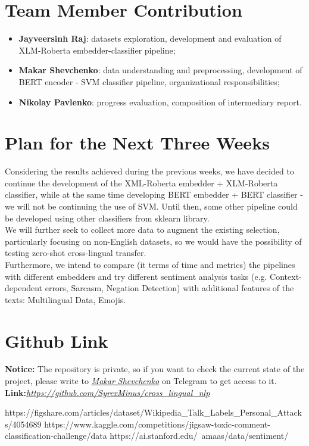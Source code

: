 \documentclass[]{article}
\begin{document}
	\section{Team Member Contribution}
	
	\begin{itemize}
		\item \textbf{Jayveersinh Raj}: datasets exploration, development and evaluation of XLM-Roberta embedder-classifier pipeline;
		\item \textbf{Makar Shevchenko}: data understanding and preprocessing, development of BERT encoder - SVM classifier pipeline, organizational responsibilities;
		\item \textbf{Nikolay Pavlenko}: progress evaluation, composition of intermediary report. 
	\end{itemize}

	\section{Plan for the Next Three Weeks}
	
	Considering the results achieved during the previous weeks, we have decided to continue the development of the XML-Roberta embedder + XLM-Roberta classifier, while at the same time developing BERT embedder + BERT classifier - we will not be continuing the use of SVM. Until then, some other pipeline could be developed using other classifiers from sklearn library. \\
	We will further seek to collect more data to augment the existing selection, particularly focusing on non-English datasets, so we would have the possibility of testing zero-shot cross-lingual transfer. \\
	Furthermore, we intend to compare (it terms of time and metrics) the pipelines with different embedders and try different sentiment analysis tasks (e.g. Context-dependent errors, Sarcasm, Negation Detection) with additional features of the texts: Multilingual Data, Emojis.
	
	\section{Github Link}
	\textbf{Notice:} The repository is private, so if you want to check the current state of the project, please write to \href{https://t.me/syrexminus}{\emph{Makar Shevchenko}} on Telegram to get access to it.
	\textbf{Link:}\href{https://github.com/SyrexMinus/cross\_lingual\_nlp}{\emph{https://github.com/SyrexMinus/cross\_lingual\_nlp}}
	
	\begin{thebibliography}{9}
		 https://figshare.com/articles/dataset/Wikipedia\_Talk\_Labels\_Personal\_Attacks/4054689
		https://www.kaggle.com/competitions/jigsaw-toxic-comment-classification-challenge/data
		https://ai.stanford.edu/~amaas/data/sentiment/
	\end{thebibliography}
	
\end{document}
